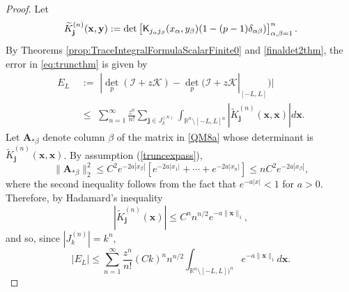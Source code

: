 \documentclass{birkjour}
\theoremstyle{definition}
\theoremstyle{remark}
\numberwithin{equation}{section}
\begin{document}
\begin{proof}
Let
\begin{equation}\label{QM8a}
    \widetilde{K}^{(n)}_{\mathbf{j}}(\mathbf{x}, \mathbf{y}) := {\det}\left[ \textsf K_{j_{\alpha}j_{\beta}}(x_{\alpha}, y_{\beta}) (1 - (p-1)\delta_{\alpha \beta}) \right]_{\alpha, \beta = 1}^{n}.
\end{equation}
By Theorems \ref{prop:TraceIntegralFormulaScalarFinite0} and \ref{finaldet2thm}, the error in \eqref{eq:truncthm}  is given by 
\begin{align}\label{seriesL}
    E_{L} &\,\,:=\,\, |{\det}_p(\mathcal{I} + z\mathcal{K}) - {\det}_p(\mathcal{I} + z \mathcal{K}|_{[-L,L]})| 
    \nonumber
 \\    
   & \,\,\leq\,\,  \sum_{n=1}^{\infty} \frac{z^n}{n!} \sum_{\mathbf{j} \in J^{(n)}_k} \int_{\mathbb{R}^n \setminus [-L,L]^n} |\widetilde{K}^{(n)}_{\mathbf{j}}(\mathbf{x}, \mathbf{x})| d\mathbf{x}.
\end{align}
Let 
$\mathbf{A}_{*\beta}$ denote column $\beta$ of the matrix in \eqref{QM8a} whose determinant 
is  $\widetilde{K}^{(n)}_{\mathbf{j}}(\mathbf{x}, \mathbf{x})$.
By assumption (\ref{truncexpass}), 
\begin{equation} 
\|\mathbf{A}_{*\beta}\|_2 ^2  
\leq C^2 e^{-2 a |x_{\beta}|} \left[ e^{-2 a|x_1|} + \cdots + e^{-2 a|x_n|} \right]
\leq n C^2 e^{-2 a  |x_{\beta}|},
\end{equation}
where the second inequality follows from the fact that $e^{-a|x|} < 1$ for $a > 0.$
Therefore, by Hadamard's inequality
\begin{equation}\label{ktildehad}
    |\widetilde{K}^{(n)}_{\mathbf{j}}(\mathbf{x})| \leq C^n n^{n/2} e^{- a  \|\mathbf{x}\|_1},
\end{equation}
and so, since $|J^{(n)}_k| = k^n$,  
\begin{equation}\label{EL}
    |E_{L}| \leq \sum_{n=1}^{\infty} \frac{z^n}{n!} (Ck)^n n^{n/2} \int_{\mathbb{R}^n \setminus [-L,L])^n} e^{-a \|\mathbf{x}\|_1} d\mathbf{x}.
\end{equation}


\end{proof}
\end{document}
